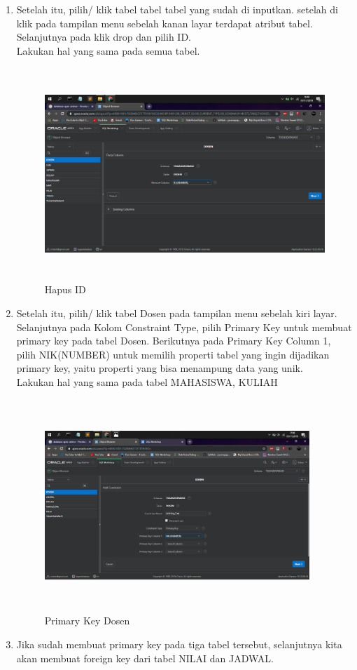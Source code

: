 \begin{enumerate}
\item Setelah itu, pilih/ klik tabel tabel tabel yang sudah di inputkan. setelah di klik pada tampilan menu sebelah kanan layar terdapat atribut tabel. Selanjutnya pada klik drop dan pilih ID.
\\ Lakukan hal yang sama pada semua tabel.

\begin{figure}[!htbp]
\centering
\includegraphics[width=11cm,height=8cm]{figures/hapusid.png}
\caption{Hapus ID}
\label{penanda}
\end{figure}
\item Setelah itu, pilih/ klik tabel Dosen pada tampilan menu sebelah kiri layar. Selanjutnya pada Kolom Constraint Type, pilih Primary Key untuk membuat primary key pada tabel Dosen. Berikutnya pada Primary Key Column 1, pilih NIK(NUMBER) untuk memilih properti tabel yang ingin dijadikan primary key, yaitu properti yang bisa menampung data yang unik.
\\ Lakukan hal yang sama pada tabel MAHASISWA, KULIAH

\begin{figure}[!htbp]
\centering
\includegraphics[width=10cm,height=8cm]{figures/primarykey1.png}
\caption{Primary Key Dosen}
\label{penanda}
\end{figure}
\vspace{54ex}
\item  Jika sudah membuat primary key pada tiga tabel tersebut, selanjutnya kita akan membuat foreign key dari tabel NILAI dan JADWAL.


\end{enumerate}
